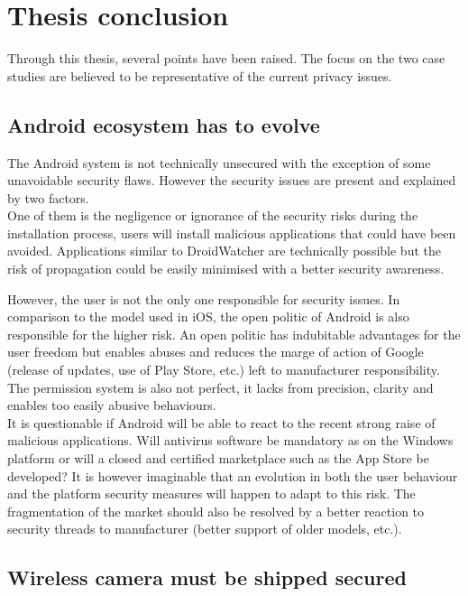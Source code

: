 \chapter{Thesis conclusion}
\label{chap:thesis-ccl}


Through this thesis, several points have been raised.
The focus on the two case studies are believed to be representative of the current privacy issues.

\section{Android ecosystem has to evolve}

The Android system is not technically unsecured with the exception of some unavoidable security flaws.
However the security issues are present and explained by two factors.\\

One of them is the negligence or ignorance of the security risks during the installation process, users will install malicious applications that could have been avoided.
Applications similar to DroidWatcher are technically possible but the risk of propagation could be easily minimised with a better security awareness.

However, the user is not the only one responsible for security issues.
In comparison to the model used in iOS, the open politic of Android is also responsible for the higher risk.
An open politic has indubitable advantages for the user freedom but enables abuses and reduces the marge of action of Google (release of updates, use of Play Store, etc.) left to manufacturer responsibility.
The permission system  is also not perfect, it lacks from precision, clarity and enables too easily abusive behaviours.\\

It is questionable if Android will be able to react to the recent strong raise of malicious applications.
Will antivirus software be mandatory as on the Windows platform or will a closed and certified marketplace such as the App Store be developed?
It is however imaginable that an evolution in both the user behaviour and the platform security measures will happen to adapt to this risk.
The fragmentation of the market should also be resolved by a better reaction to security threads to manufacturer (better support of older models, etc.).

\section{Wireless camera must be shipped secured}


